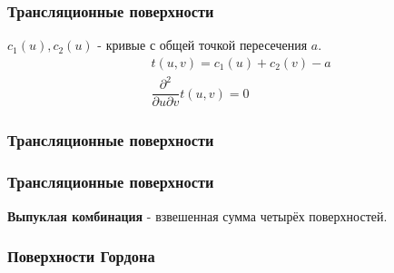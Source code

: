 \documentclass[14pt]{beamer}
\begin{document}
\begin{frame}
\frametitle{Трансляционные поверхности}
$c_1(u), c_2(u)$ - кривые с общей точкой пересечения $a$.
\begin{align*}
  &t(u, v) = c_1(u) + c_2(v) - a\\
  &\dfrac{\partial^2}{\partial u \partial v}t(u, v) = 0
\end{align*}
\end{frame}

\begin{frame}
\frametitle{Трансляционные поверхности}
\end{frame}

\begin{frame}
\frametitle{Трансляционные поверхности}
\textbf{Выпуклая комбинация} - взвешенная сумма четырёх поверхностей.
\end{frame}

\begin{frame}
\frametitle{Поверхности Гордона}
\end{frame}
\end{document}

